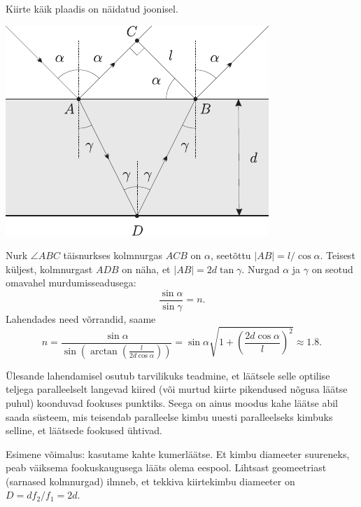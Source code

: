 \documentclass[10pt]{article}
\begin{document}
{%

\solu
Kiirte käik plaadis on näidatud joonisel.

\begin{center}
	\includegraphics[width=0.7\linewidth]{2007-lahg-04-lah}
\end{center}

Nurk $\angle ABC$ täisnurkses kolmnurgas $ACB$ on $\alpha$, seetõttu $|AB| = l/ \cos \alpha$. Teisest küljest, kolmnurgast $ADB$ on näha, et $|AB| = 2d \tan \gamma$. Nurgad $\alpha$ ja $\gamma$ on seotud omavahel murdumisseadusega:
\[
\frac{\sin\alpha}{\sin\gamma} = n.
\]
Lahendades need võrrandid, saame
\[
n=\frac{\sin\alpha}{\sin\left(\arctan\left(\frac{l}{2d\cos\alpha}\right)\right)} =\sin \alpha \sqrt{1+\left(\frac{2 d \cos \alpha}{l}\right)^{2}} \approx \num{1,8}.
\]
\probend
\bigskip


\solu
Ülesande lahendamisel osutub tarvilikuks teadmine, et läätsele selle optilise teljega paralleelselt langevad kiired (või murtud kiirte pikendused nõgusa läätse puhul) koonduvad fookuses punktiks. Seega on ainus moodus kahe läätse abil saada süsteem, mis teisendab paralleelse kimbu uuesti paralleelseks kimbuks selline, et läätsede fookused ühtivad. 

Esimene võimalus: kasutame kahte kumerläätse. Et kimbu diameeter suureneks, peab väiksema fookuskaugusega lääts olema eespool. Lihtsast geomeetriast (sarnased kolmnurgad) ilmneb, et tekkiva kiirtekimbu diameeter on $D = df_2/f_1 = 2d$.

}
\end{document}

